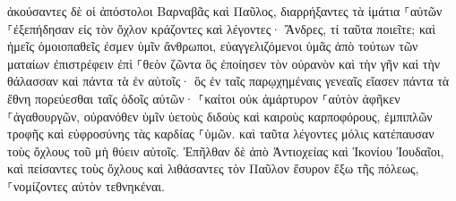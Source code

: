 \documentclass{openreader}
\begin{document}
ἀκούσαντες δὲ οἱ ἀπόστολοι Βαρναβᾶς καὶ Παῦλος, διαρρήξαντες τὰ ἱμάτια ⸀αὐτῶν ⸀ἐξεπήδησαν εἰς τὸν ὄχλον κράζοντες 
καὶ λέγοντες· Ἄνδρες, τί ταῦτα ποιεῖτε; καὶ ἡμεῖς ὁμοιοπαθεῖς ἐσμεν ὑμῖν ἄνθρωποι, εὐαγγελιζόμενοι ὑμᾶς ἀπὸ τούτων τῶν ματαίων ἐπιστρέφειν ἐπὶ ⸀θεὸν ζῶντα ὃς ἐποίησεν τὸν οὐρανὸν καὶ τὴν γῆν καὶ τὴν θάλασσαν καὶ πάντα τὰ ἐν αὐτοῖς· 
ὃς ἐν ταῖς παρῳχημέναις γενεαῖς εἴασεν πάντα τὰ ἔθνη πορεύεσθαι ταῖς ὁδοῖς αὐτῶν· 
⸀καίτοι οὐκ ἀμάρτυρον ⸀αὑτὸν ἀφῆκεν ⸀ἀγαθουργῶν, οὐρανόθεν ὑμῖν ὑετοὺς διδοὺς καὶ καιροὺς καρποφόρους, ἐμπιπλῶν τροφῆς καὶ εὐφροσύνης τὰς καρδίας ⸀ὑμῶν. 
καὶ ταῦτα λέγοντες μόλις κατέπαυσαν τοὺς ὄχλους τοῦ μὴ θύειν αὐτοῖς. 
Ἐπῆλθαν δὲ ἀπὸ Ἀντιοχείας καὶ Ἰκονίου Ἰουδαῖοι, καὶ πείσαντες τοὺς ὄχλους καὶ λιθάσαντες τὸν Παῦλον ἔσυρον ἔξω τῆς πόλεως, ⸀νομίζοντες αὐτὸν τεθνηκέναι. 
\end{document}
